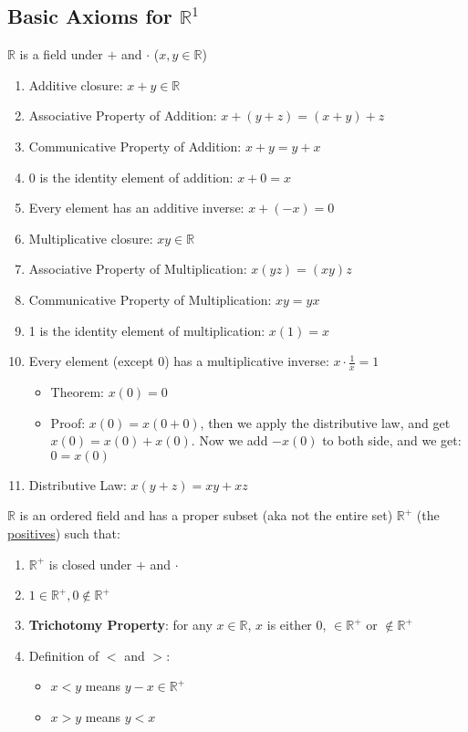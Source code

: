\documentclass[11 pt, twoside]{article}
\begin{document}
\subsection{Basic Axioms for $\mathbb{R}^1$}
$\mathbb{R}$ is a field under $+$ and $\cdot$ ($x, y \in \mathbb{R}$)
\begin{enumerate}
\item Additive closure: $x + y \in \mathbb{R}$
\item Associative Property of Addition: $x + (y + z) = (x + y) + z$
\item Communicative Property of Addition: $x + y = y + x$
\item 0 is the identity element of addition: $x + 0 = x$
\item Every element has an additive inverse: $x + (-x) = 0$
\item Multiplicative closure: $xy \in \mathbb{R}$
\item Associative Property of Multiplication: $x(yz) = (xy)z$
\item Communicative Property of Multiplication: $xy = yx$
\item 1 is the identity element of multiplication: $x(1) = x$
\item Every element (except 0) has a multiplicative inverse: $x \cdot \frac{1}{x} = 1$
\begin{itemize}
\item Theorem: $x(0) = 0$
\item Proof: $x(0) = x(0 + 0)$, then we apply the distributive law,
and get $x(0) = x(0) + x(0)$. Now we add $-x(0)$ to both side,
and we get: $0 = x(0)$
\end{itemize}
\item Distributive Law: $x(y + z) = xy + xz$
\end{enumerate}
\vspace{11pt}
$\mathbb{R}$ is an ordered field and has a proper subset (aka not the entire
set) $\mathbb{R}^+$ (the \underline{positives}) such that:
\begin{enumerate}
\item $\mathbb{R}^+$ is closed under $+$ and $\cdot$
\item $1 \in \mathbb{R}^+, 0 \notin \mathbb{R}^+$
\item \textbf{Trichotomy Property}: for any $x \in \mathbb{R}$, $x$ is
either $0$, $\in \mathbb{R}^+$ or $\notin \mathbb{R}^+$

\item Definition of $<$ and $>$:
\begin{itemize}
\item $x < y$ means $y - x \in \mathbb{R}^+$
\item $x > y$ means $y < x$
\end{itemize}
\end{enumerate}
\end{document}
